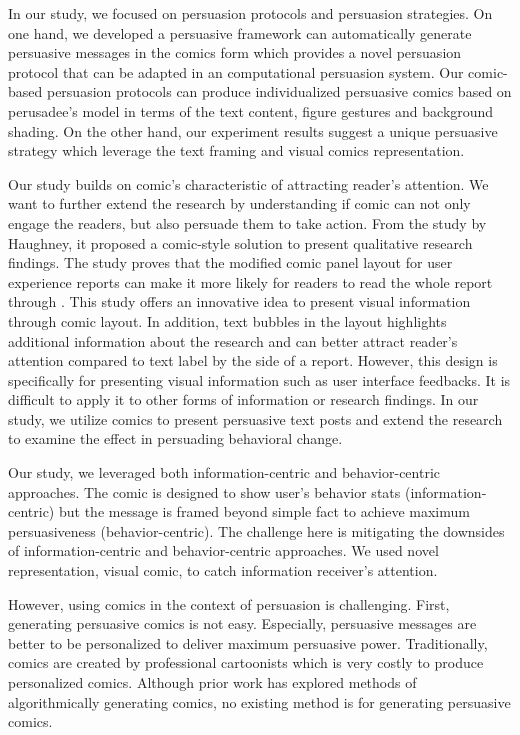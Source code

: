 In our study, we focused on persuasion protocols and persuasion strategies. On one hand, we developed a persuasive framework can automatically generate persuasive messages in the comics form which provides a novel persuasion protocol that can be adapted in an computational persuasion system. Our comic-based persuasion protocols can produce individualized persuasive comics based on perusadee's model in terms of the text content, figure gestures and background shading. On the other hand, our experiment results suggest a unique persuasive strategy which leverage the text framing and visual comics representation. \par

Our study builds on comic's characteristic of attracting reader's attention. We want to further extend the research by understanding if comic can not only engage the readers, but also persuade them to take action. From the study by Haughney, it proposed a comic-style solution to present qualitative research findings. The study proves that the modified comic panel layout for user experience reports can make it more likely for readers to read the whole report through \cite{haughney2008using}. This study offers an innovative idea to present visual information through comic layout. In addition, text bubbles in the layout highlights additional information about the research and can better attract reader's attention compared to text label by the side of a report. However, this design is specifically for presenting visual information such as user interface feedbacks. It is difficult to apply it to other forms of information or research findings. In our study, we utilize comics to present persuasive text posts and extend the research to examine the effect in persuading behavioral change.\par

Our study, we leveraged both information-centric and behavior-centric approaches. The comic is designed to show user's behavior stats (information-centric) but the message is framed beyond simple fact to achieve maximum persuasiveness (behavior-centric). The challenge here is mitigating the downsides of information-centric and behavior-centric approaches. We used novel representation, visual comic, to catch information receiver's attention.


However, using comics in the context of persuasion is challenging. First, generating persuasive comics is not easy. Especially, persuasive messages are better to be personalized to deliver maximum persuasive power. Traditionally, comics are created by professional cartoonists which is very costly to produce personalized comics.  Although prior work has explored methods of algorithmically generating comics, no existing method is for generating persuasive comics.


